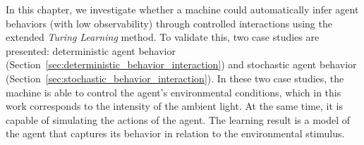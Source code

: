In this chapter, we investigate whether a machine could automatically infer agent behaviors (with low observability) through controlled interactions using the extended \textit{Turing Learning} method. To validate this, two case studies are presented: deterministic agent behavior (Section~\ref{sec:deterministic_behavior_interaction}) and stochastic agent behavior (Section~\ref{sec:stochastic_behavior_interaction}). In these two case studies, the machine is able to control the agent's environmental conditions, which in this work corresponds to the intensity of the ambient light. At the same time, it is capable of simulating the actions of the agent. The learning result is a model of the agent that captures its behavior in relation to the environmental stimulus. 


